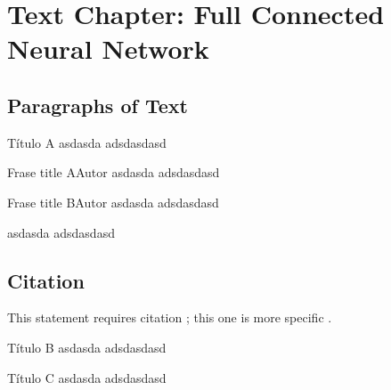 
\chapter{Text Chapter: Full Connected Neural Network}


\section{Paragraphs of Text}

\lipsum[1] %

\begin{informationbox}{Título A}
asdasda
\lipsum[1] 
adsdasdasd
\end{informationbox}
\lipsum[1] %


\begin{frasebox}{Frase title A}{Autor}
asdasda
\lipsum[1] 
adsdasdasd
\end{frasebox}

\begin{frasebox}{Frase title B}{Autor}
asdasda
\lipsum[1] 
adsdasdasd
\end{frasebox}

\lipsum[1] %
\begin{citando}
asdasda
\lipsum[1] 
adsdasdasd
\end{citando}


\section{Citation}

This statement requires citation \cite{book_key}; this one is more specific \cite[122]{article_key}.


\lipsum[1-2] %

\begin{informationbox}{Título B}
asdasda
\lipsum[1] 
adsdasdasd
\end{informationbox}


\lipsum[1-2] %
\begin{elaborationbox}{Título C}
asdasda
\lipsum[1] 
adsdasdasd
\end{elaborationbox}


